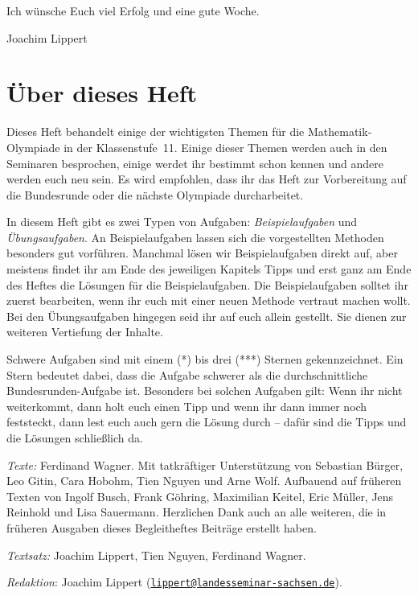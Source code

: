\documentclass[a4paper, 12pt]{article}
\begin{document}
	Ich wünsche Euch viel Erfolg und eine gute Woche.
	
	Joachim Lippert
	
	\section*{Über dieses Heft}
	Dieses Heft behandelt einige der wichtigsten Themen für die Mathematik-Olympiade in der Klassenstufe~11. Einige dieser Themen werden auch in den Seminaren besprochen, einige werdet ihr bestimmt schon kennen und andere werden euch neu sein. Es wird empfohlen, dass ihr das Heft zur Vorbereitung auf die Bundesrunde oder die nächste Olympiade durcharbeitet.
	
	In diesem Heft gibt es zwei Typen von Aufgaben: \emph{Beispielaufgaben} und \emph{Übungsaufgaben}. An Beispielaufgaben lassen sich die vorgestellten Methoden besonders gut vorführen. Manchmal lösen wir Beispielaufgaben direkt auf, aber meistens findet ihr am Ende des jeweiligen Kapitels Tipps und erst ganz am Ende des Heftes die Lösungen für die Beispielaufgaben. Die Beispielaufgaben solltet ihr zuerst bearbeiten, wenn ihr euch mit einer neuen Methode vertraut machen wollt. Bei den Übungsaufgaben hingegen seid ihr auf euch allein gestellt. Sie dienen zur weiteren Vertiefung der Inhalte.
	
	Schwere Aufgaben sind mit einem (*) bis drei (***) Sternen gekennzeichnet. Ein Stern bedeutet dabei, dass die Aufgabe schwerer als die durchschnittliche Bundesrunden-Aufgabe ist. Besonders bei solchen Aufgaben gilt: Wenn ihr nicht weiterkommt, dann holt euch einen Tipp und wenn ihr dann immer noch feststeckt, dann lest euch auch gern die Lösung durch -- dafür sind die Tipps und die Lösungen schließlich da.
	
	
	\vfill
	
	\scriptsize
	
	\emph{Texte:} Ferdinand Wagner. Mit tatkräftiger Unterstützung von Sebastian Bürger, Leo Gitin, Cara Hobohm, Tien Nguyen und Arne Wolf. Aufbauend auf früheren Texten von Ingolf Busch, Frank Göhring, Maximilian Keitel, Eric Müller, Jens Reinhold und Lisa Sauermann. Herzlichen Dank auch an alle weiteren, die in früheren Ausgaben dieses Begleitheftes Beiträge erstellt haben.
	
	\emph{Textsatz:} Joachim Lippert, Tien Nguyen, Ferdinand Wagner.
	
	\emph{Redaktion}: Joachim Lippert (\href{mailto:lippert@landesseminar-sachsen.de}{\texttt{lippert@landesseminar-sachsen.de}}).
	\normalsize
	
\end{document}

